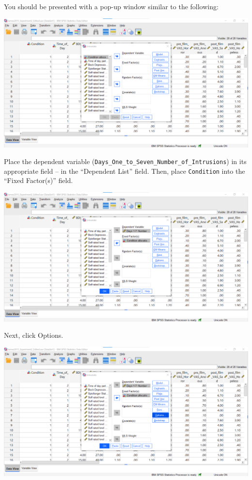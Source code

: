 \documentclass[
]{book}
\begin{document}
You should be presented with a pop-up window similar to the following:

\includegraphics{img/8.6.6.35.png}

Place the dependent variable (\texttt{Days\_One\_to\_Seven\_Number\_of\_Intrusions}) in its appropriate field -- in the ``Dependent List'' field. Then, place \texttt{Condition} into the ``Fixed Factor(s)'' field.

\includegraphics{img/8.6.6.36.png}

Next, click {Options}.

\includegraphics{img/8.6.6.37.png}
\end{document}

